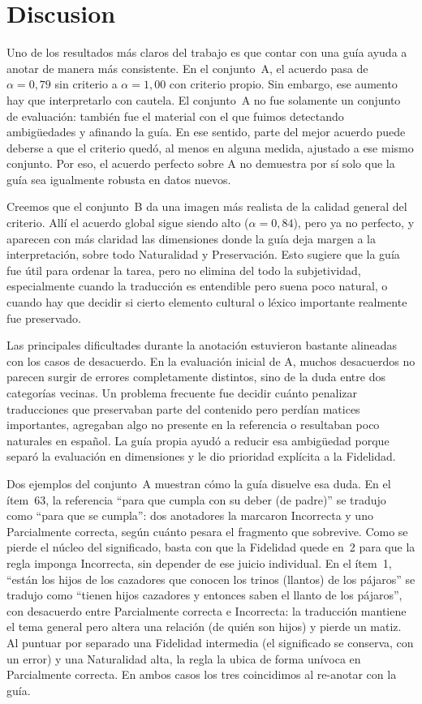 \section{Discusion}
\label{sec:discusion}

Uno de los resultados más claros del trabajo es que contar con una guía ayuda a
anotar de manera más consistente. En el conjunto~A, el acuerdo pasa de
$\alpha=0{,}79$ sin criterio a $\alpha=1{,}00$ con criterio propio. Sin embargo,
ese aumento hay que interpretarlo con cautela. El conjunto~A no fue solamente un
conjunto de evaluación: también fue el material con el que fuimos detectando
ambigüedades y afinando la guía. En ese sentido, parte del mejor acuerdo puede
deberse a que el criterio quedó, al menos en alguna medida, ajustado a ese mismo
conjunto. Por eso, el acuerdo perfecto sobre A no demuestra por sí solo que la
guía sea igualmente robusta en datos nuevos.

Creemos que el conjunto~B da una imagen más realista de la calidad general del
criterio. Allí el acuerdo global sigue siendo alto ($\alpha=0{,}84$), pero ya no
perfecto, y aparecen con más claridad las dimensiones donde la guía deja margen a
la interpretación, sobre todo Naturalidad y Preservación. Esto sugiere que la
guía fue útil para ordenar la tarea, pero no elimina del todo la subjetividad,
especialmente cuando la traducción es entendible pero suena poco natural, o cuando
hay que decidir si cierto elemento cultural o léxico importante realmente fue
preservado.

Las principales dificultades durante la anotación estuvieron bastante alineadas con
los casos de desacuerdo. En la evaluación inicial de A, muchos desacuerdos no
parecen surgir de errores completamente distintos, sino de la duda entre dos
categorías vecinas. Un problema frecuente fue
decidir cuánto penalizar traducciones que preservaban parte del contenido pero
perdían matices importantes, agregaban algo no presente en la referencia o
resultaban poco naturales en español. La guía propia ayudó a reducir esa
ambigüedad porque separó la evaluación en dimensiones y le dio prioridad explícita
a la Fidelidad.

Dos ejemplos del conjunto~A muestran cómo la guía disuelve esa duda. En el
ítem~63, la referencia ``para que cumpla con su deber (de padre)'' se tradujo
como ``para que se cumpla'': dos anotadores la marcaron Incorrecta y uno
Parcialmente correcta, según cuánto pesara el fragmento que sobrevive. Como se
pierde el núcleo del significado, basta con que la Fidelidad quede en~2 para que
la regla imponga Incorrecta, sin depender de ese juicio individual. En el
ítem~1, ``están los hijos de los cazadores que conocen los trinos (llantos) de
los pájaros'' se tradujo como ``tienen hijos cazadores y entonces saben el llanto
de los pájaros'', con desacuerdo entre Parcialmente correcta e Incorrecta: la
traducción mantiene el tema general pero altera una relación (de quién son hijos)
y pierde un matiz. Al puntuar por separado una Fidelidad intermedia (el
significado se conserva, con un error) y una Naturalidad alta, la regla la ubica
de forma unívoca en Parcialmente correcta. En ambos casos los tres coincidimos al
re-anotar con la guía.

